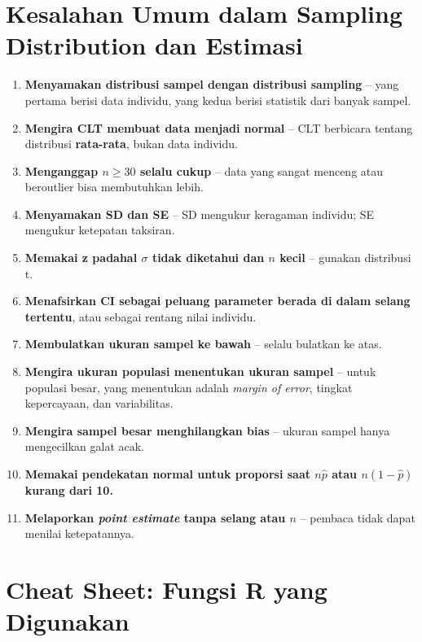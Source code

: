 \documentclass[
  indonesian,
  letterpaper,
]{book}
\providecommand{\tightlist}{%
  \setlength{\itemsep}{0pt}\setlength{\parskip}{0pt}}
\begin{document}
\section{Kesalahan Umum dalam Sampling Distribution dan
Estimasi}\label{kesalahan-umum-dalam-sampling-distribution-dan-estimasi}

\begin{enumerate}
\def\labelenumi{\arabic{enumi}.}
\tightlist
\item
  \textbf{Menyamakan distribusi sampel dengan distribusi sampling} --
  yang pertama berisi data individu, yang kedua berisi statistik dari
  banyak sampel.
\item
  \textbf{Mengira CLT membuat data menjadi normal} -- CLT berbicara
  tentang distribusi \textbf{rata-rata}, bukan data individu.
\item
  \textbf{Menganggap \(n \geq 30\) selalu cukup} -- data yang sangat
  menceng atau beroutlier bisa membutuhkan lebih.
\item
  \textbf{Menyamakan SD dan SE} -- SD mengukur keragaman individu; SE
  mengukur ketepatan taksiran.
\item
  \textbf{Memakai z padahal \(\sigma\) tidak diketahui dan \(n\) kecil}
  -- gunakan distribusi t.
\item
  \textbf{Menafsirkan CI sebagai peluang parameter berada di dalam
  selang tertentu}, atau sebagai rentang nilai individu.
\item
  \textbf{Membulatkan ukuran sampel ke bawah} -- selalu bulatkan ke
  atas.
\item
  \textbf{Mengira ukuran populasi menentukan ukuran sampel} -- untuk
  populasi besar, yang menentukan adalah \emph{margin of error}, tingkat
  kepercayaan, dan variabilitas.
\item
  \textbf{Mengira sampel besar menghilangkan bias} -- ukuran sampel
  hanya mengecilkan galat acak.
\item
  \textbf{Memakai pendekatan normal untuk proporsi saat \(n\hat{p}\)
  atau \(n(1-\hat{p})\) kurang dari 10.}
\item
  \textbf{Melaporkan \emph{point estimate} tanpa selang atau \(n\)} --
  pembaca tidak dapat menilai ketepatannya.
\end{enumerate}

\section{Cheat Sheet: Fungsi R yang
Digunakan}\label{cheat-sheet-fungsi-r-yang-digunakan}
\end{document}
